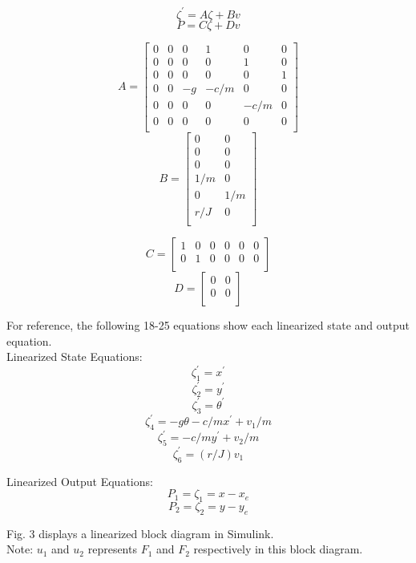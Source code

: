 \documentclass[conference]{IEEEtran}
\begin{document}
\[
\zeta^\prime = A\zeta + Bv
\tag{12}
\] 
\[
P = C\zeta + Dv
\tag{13}
\] 

\[
A = 
\begin{bmatrix}
0&0& 0& 1& 0 &0\\
0 &0 &0 &0 &1 &0\\
0 &0 &0 &0 &0 &1\\
0 &0 &-g& -c/m &0 &0\\
0 &0 &0 &0 &-c/m &0\\
0 &0 &0 &0 &0 &0\\
\end{bmatrix}
\tag{14}
\]
\[
B = 
\begin{bmatrix}
0 &0\\
0 &0\\
0 &0\\
1/m& 0\\
0 &1/m\\
r/J& 0\\
\end{bmatrix}
\tag{15}
\] 

\[
C = 
\begin{bmatrix}
1&0&0&0&0&0\\
0&1&0&0&0&0\\
\end{bmatrix}
\tag{16}
\]
\[
D =
\begin{bmatrix}
0&0\\
0&0\\
\end{bmatrix}
\tag{17}
\] 

For reference, the following 18-25 equations show each linearized state and output equation.\\ 

Linearized State Equations:
\[
\zeta_1^\prime = x^\prime\tag{18}
\] 
\[
\zeta_2^\prime = y^\prime\tag{19}
\]
\[
 \zeta_3^\prime = \theta^\prime \tag{20}
\]
\[
\zeta_4^\prime = -g\theta -c/mx^\prime + v_1/m \tag{21}
\]
\[
\zeta_5^\prime = -c/my^\prime + v_2/m \tag{22}
\]
\[
\zeta_6^\prime = (r/J)v_1 \tag{23}
\]

Linearized Output Equations:
\[
P_1 = \zeta_1 = x - x_e \tag{24}
\]
\[
P_2 = \zeta_2 = y - y_e \tag{25}
\]

\newpage
Fig. 3 displays a linearized block diagram in Simulink. \\
Note: $u_1$ and $u_2$ represents $F_1$ and $F_2$ respectively in this block diagram. \\
\end{document}
